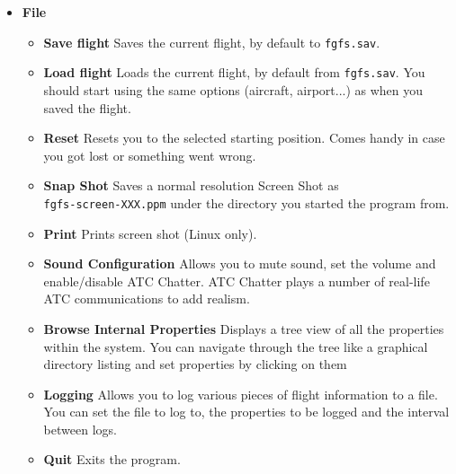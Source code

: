 \begin{itemize}
 \item \textbf{File}
 \begin{itemize}
  \item \textbf{Save flight} Saves the current flight, by
default to \texttt{fgfs.sav}.
 \item \textbf{Load flight} Loads the current flight, by
default from \texttt{fgfs.sav}. You should
start \FlightGear{} using the same options (aircraft, airport...) as when you
saved the flight.
 \item \textbf{Reset} Resets you to the selected starting
position. 
 Comes handy in case you got lost or something went wrong.
  \item \textbf{Snap Shot} Saves a normal resolution Screen
Shot as \\ \texttt{fgfs-screen-XXX.ppm} under 
  the directory you started the program from.
  \item \textbf{Print} Prints screen shot (Linux only).
  \item \textbf{Sound Configuration} Allows you to mute sound, set the volume
and enable/disable ATC Chatter. 
  ATC Chatter plays a number of real-life ATC communications to add realism.
  \item \textbf{Browse Internal Properties} Displays a tree view of all the
properties within the system. 
  You can navigate through the tree like a graphical directory listing and set
properties by clicking on them
  \item \textbf{Logging} Allows you to log various pieces of flight information
to a file. 
  You can set the file to log to, the properties to be logged and the interval
between logs. 
  \item \textbf{Quit} Exits the program.
 \end{itemize}


\end{itemize}
